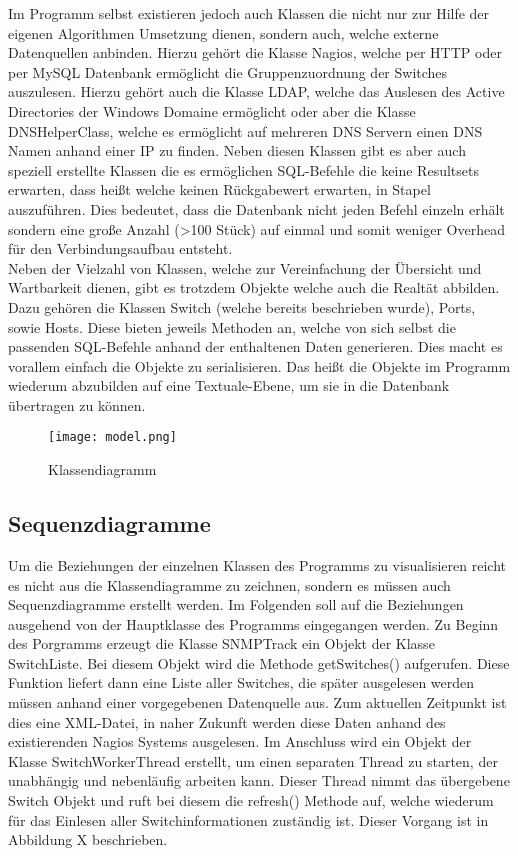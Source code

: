 Im Programm selbst existieren jedoch auch Klassen die nicht nur zur Hilfe der eigenen Algorithmen Umsetzung dienen, sondern auch, welche externe Datenquellen anbinden.
Hierzu gehört die Klasse Nagios, welche per HTTP oder per MySQL Datenbank ermöglicht die Gruppenzuordnung der Switches auszulesen.
Hierzu gehört auch die Klasse LDAP, welche das Auslesen des Active Directories der Windows Domaine ermöglicht oder aber die Klasse DNSHelperClass, welche es ermöglicht auf mehreren DNS Servern einen DNS Namen anhand einer IP zu finden. Neben diesen Klassen gibt es aber auch speziell erstellte Klassen die es ermöglichen SQL-Befehle die keine Resultsets erwarten, dass heißt welche keinen Rückgabewert erwarten, in Stapel auszuführen.
Dies bedeutet, dass die Datenbank nicht jeden Befehl einzeln erhält sondern eine große Anzahl (>100 Stück) auf einmal und somit weniger Overhead für den Verbindungsaufbau entsteht.\\
Neben der Vielzahl von Klassen, welche zur Vereinfachung der Übersicht und Wartbarkeit dienen, gibt es trotzdem Objekte welche auch die Realtät abbilden. Dazu gehören die Klassen Switch (welche bereits beschrieben wurde), Ports, sowie Hosts. Diese bieten jeweils Methoden an, welche von sich selbst die passenden SQL-Befehle anhand der enthaltenen Daten generieren. Dies macht es vorallem einfach die Objekte zu serialisieren. Das heißt die Objekte im Programm wiederum abzubilden auf eine Textuale-Ebene, um sie in die Datenbank übertragen zu können.\\

\begin{figure}[H]
\centering
\texttt{[image: model.png]}
\caption{Klassendiagramm}
\label{fig:classdiagram}
\end{figure}

\subsection{Sequenzdiagramme}
\label{subsec:seqdiagrams}

Um die Beziehungen der einzelnen Klassen des Programms zu visualisieren reicht es nicht aus die Klassendiagramme zu zeichnen, sondern es müssen auch Sequenzdiagramme erstellt werden.
Im Folgenden soll auf die Beziehungen ausgehend von der Hauptklasse des Programms eingegangen werden.
Zu Beginn des Porgramms erzeugt die Klasse SNMPTrack ein Objekt der Klasse SwitchListe.
Bei diesem Objekt wird die Methode getSwitches() aufgerufen. Diese Funktion liefert dann eine Liste aller Switches, die später ausgelesen werden müssen anhand einer vorgegebenen Datenquelle aus. Zum aktuellen Zeitpunkt ist dies eine XML-Datei, in naher Zukunft werden diese Daten anhand des existierenden Nagios Systems ausgelesen. Im Anschluss wird ein Objekt der Klasse SwitchWorkerThread erstellt, um einen separaten Thread zu starten, der unabhängig und nebenläufig arbeiten kann. Dieser Thread nimmt das übergebene Switch Objekt und ruft bei diesem die refresh() Methode auf, welche wiederum für das Einlesen aller Switchinformationen zuständig ist. Dieser Vorgang ist in Abbildung X beschrieben.


